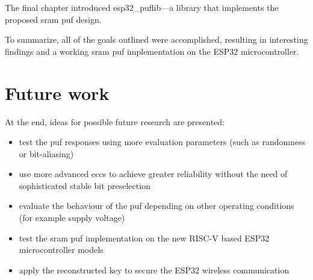 The final chapter introduced esp32\_puflib---a library that implements the proposed \gls{sram} \gls{puf} design.

To summarize, all of the goals outlined were accomplished, resulting in interesting findings and a working \gls{sram} \gls{puf} implementation on the ESP32 microcontroller.

\newpage

\section*{Future work}
{}

At the end, ideas for possible future research are presented:
\begin{itemize}
    \item test the \gls{puf} responses using more evaluation parameters (such as randomness or bit-aliasing)
    \item use more advanced \glspl{ecc} to achieve greater reliability without the need of sophisticated stable bit preselection
    \item evaluate the behaviour of the \gls{puf} depending on other operating conditions (for example supply voltage)
    \item test the \gls{sram} \gls{puf} implementation on the new RISC-V based ESP32 microcontroller models
    \item apply the reconstructed key to secure the ESP32 wireless communication
\end{itemize}

